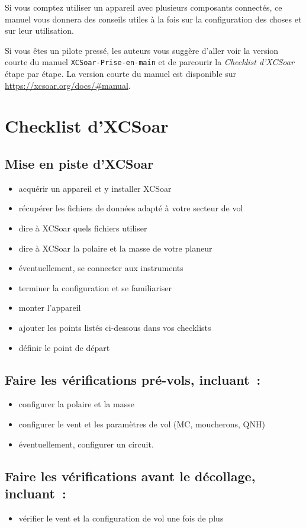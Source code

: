 Si vous comptez utiliser un appareil avec plusieurs composants connectés,
ce manuel vous donnera des conseils utiles à la fois sur la configuration des choses et sur
leur utilisation.

Si vous êtes un pilote pressé, les auteurs vous suggère d'aller voir la version courte
du manuel \texttt{XCSoar-Prise-en-main} et de parcourir la \emph{Checklist d'XCSoar}
étape par étape. La version courte du manuel est disponible sur \url{https://xcsoar.org/docs/#manual}.

\section{Checklist d'XCSoar}

\subsection*{{Mise en piste d'XCSoar}}
\begin{itemize}
\item acquérir un appareil et y installer XCSoar
\item récupérer les fichiers de données adapté à votre secteur de vol
\item dire à XCSoar quels fichiers utiliser
\item dire à XCSoar la polaire et la masse de votre planeur
\item éventuellement, se connecter aux instruments
\item terminer la configuration et se familiariser
\item monter l'appareil
\item ajouter les points listés ci-dessous dans vos checklists
\item définir le point de départ
\end{itemize}

\subsection*{Faire les vérifications pré-vols, incluant~:}
\begin{itemize}
\item configurer la polaire et la masse
\item configurer le vent et les paramètres de vol (MC, moucherons, QNH)
\item éventuellement, configurer un circuit.
\end{itemize}

\subsection*{Faire les vérifications avant le décollage, incluant~:}
\begin{itemize}
\item vérifier le vent et la configuration de vol une fois de plus
\end{itemize}
\vspace{2em}

